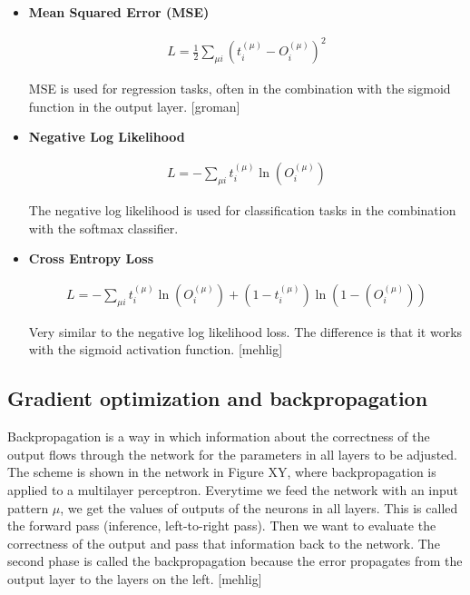 \begin{itemize}
\item \textbf{Mean Squared Error (MSE)}

\begin{gather}
	L =  \frac{1}{2} \sum\limits_{\mu i} \left( t_{i}^{(\mu)} - O_{i}^{(\mu)} \right)^2
\end{gather}

MSE is used for regression tasks, often in the combination with the sigmoid function in the output layer. [groman]

\item \textbf{Negative Log Likelihood} 

\begin{gather}
	L = - \sum\limits_{\mu i}  t_{i}^{(\mu)} \ln (O_{i}^{(\mu)})
\end{gather}

The negative log likelihood is used for classification tasks in the combination with the softmax classifier.

\item \textbf{Cross Entropy Loss} 

\begin{gather}
	L = - \sum\limits_{\mu i}  t_{i}^{(\mu)} \ln (O_{i}^{(\mu)}) + (1 - t_{i}^{(\mu)}) \ln (1 - (O_{i}^{(\mu)}))
\end{gather}

Very similar to the negative log likelihood loss. The difference is that it works with the sigmoid activation function. [mehlig]

\end{itemize}  

\subsection{Gradient optimization and backpropagation}

Backpropagation is a way in which information about the correctness of the output flows through the network for the parameters in all layers to be adjusted. The scheme is shown in the network in Figure XY, where backpropagation is applied to a multilayer perceptron. Everytime we feed the network with an input pattern $ \mu $, we get the values of outputs of the neurons in all layers. This is called the forward pass (inference, left-to-right pass). Then we want to evaluate the correctness of the output and pass that information back to the network. The second phase is called the backpropagation because the error propagates from the output layer to the layers on the left. [mehlig]  

